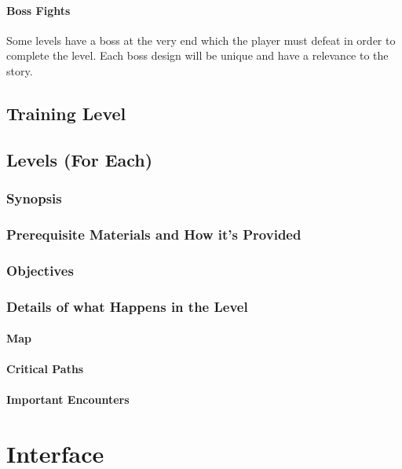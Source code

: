 \documentclass[12pt]{article}
\begin{document}
\paragraph{Boss Fights}

Some levels have a boss at the very end which the player must defeat in order to complete the level. Each boss design will be unique and have a relevance to the story. 

\subsection{Training Level}

\subsection{Levels (For Each)}

\subsubsection{Synopsis}

\subsubsection{Prerequisite Materials and How it's Provided}

\subsubsection{Objectives}

\subsubsection{Details of what Happens in the Level}

\paragraph{Map}

\paragraph{Critical Paths}

\paragraph{Important Encounters}

\section{Interface}
\end{document}

